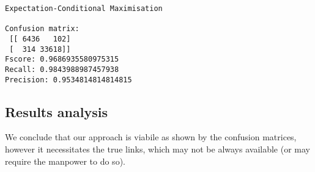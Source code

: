 \documentclass{article}
\begin{document}
    \begin{Verbatim}[commandchars=\\\{\}]

\end{Verbatim}

    \begin{Verbatim}[commandchars=\\\{\}]
Expectation-Conditional Maximisation 

Confusion matrix: 
 [[ 6436   102]
 [  314 33618]]
Fscore: 0.9686935580975315
Recall: 0.9843988987457938
Precision: 0.9534814814814815

    \end{Verbatim}

    \hypertarget{results-analysis}{%
\subsection{Results analysis}\label{results-analysis}}

We conclude that our approach is viabile as shown by the confusion
matrices, however it necessitates the true links, which may not be
always available (or may require the manpower to do so).


    
    
    
\end{document}
